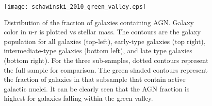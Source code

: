 \begin{figure}[t]
\centering
\texttt{[image: schawinski\_2010\_green\_valley.eps]}
\caption[Distribution of the fraction of galaxies containing AGN]{\footnotesize Distribution of the fraction of galaxies containing AGN.  Galaxy color in u-r is plotted vs stellar mass.  The contours are the galaxy population for all galaxies (top-left), early-type galaxies (top right), intermediate-type galaxies (bottom left), and late type galaxies (bottom right).  For the three sub-samples, dotted contours represent the full sample for comparison.  The green shaded contours represent the fraction of galaxies in that subsample that contain active galactic nuclei.  It can be clearly seen that the AGN fraction is highest for galaxies falling within the green valley.  \citep{schawinski_2010}}
\label{fig:green_valley}
\end{figure}



